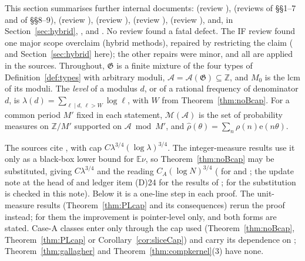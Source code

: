 \documentclass[10pt,reqno]{amsart}
\theoremstyle{definition}
\theoremstyle{remark}
\newcommand{\A}{\mathcal A}
\newcommand{\cG}{\mathfrak G}
\newcommand{\E}{\mathbb E}
\newcommand{\Z}{\mathbb Z}
\newcommand{\e}{\mathrm e}
\begin{document}
This section summarises further internal documents: \cite{LS}
(review \cite{LSrev}), \cite{LS2} (reviews \cite{LS2rev} of \S\S1--7 and
\cite{LS2revb} of \S\S8--9), \cite{LS3} (review \cite{LS3rev}), \cite{LS4} (review \cite{LS4rev}), \cite{PL}
(review \cite{PLrev}), \cite{IF} (review \cite{IFrev}), and, in
Section~\ref{sec:hybrid}, \cite{IF2}, \cite{SPW} and \cite{SPW2}.  No review found a fatal defect.  The IF review found
one major scope overclaim (hybrid methods), repaired by restricting the
claim (\cite[Rem.~2.6]{IF} and Section~\ref{sec:hybrid} here); the other
repairs were minor, and all are applied in the sources.  Throughout, $\cG$ is a finite mixture
of the four types of Definition~\ref{def:types} with arbitrary moduli,
$\A=\A(\cG)\subseteq\Z$, and $M_0$ is the lcm of its moduli.  The \emph{level}
of a modulus $d$, or of a rational frequency of denominator $d$, is
$\lambda(d)=\sum_{\ell\mid d,\,\ell>W}\log\ell$, with $W$ from
Theorem~\ref{thm:noBcap}.  For a common period $M'$ fixed in each statement,
$\mathcal M(\A)$ is the set of probability measures on $\Z/M'$ supported on
$\A\bmod M'$, and $\hat\rho(\theta)=\sum_n\rho(n)\e(n\theta)$.

The sources cite \cite[Thm~5.1]{KA2}, with cap $C\lambda^{3/4}(\log\lambda)^{3/4}$.  The
integer-measure results use it only as a black-box lower bound for $\E\nu$,
so Theorem~\ref{thm:noBcap} may be substituted, giving $C\lambda^{3/4}$ and the
reading $C_A(\log N)^{3/4}$ (\cite[\S4.3]{KA3} for \cite[Thm~3.1]{LS} and
\cite[Cor.~2.3]{IF}; the update note at the head of \cite{LS2} and ledger item
(D)24 for the results of \cite{LS2}; for \cite[Thm~2.5]{IF} the substitution
is checked in this note).  Below it is a one-line step in each proof.  The unit-measure results
(Theorem~\ref{thm:PLcap} and its consequences) rerun the proof instead; for
them the improvement is pointer-level only, and both forms are stated.  Case-A classes enter only through the cap
used (Theorem~\ref{thm:noBcap}, Theorem~\ref{thm:PLcap} or
Corollary~\ref{cor:sliceCap}) and carry its dependence on
\cite{ElsholtzTao}; Theorem~\ref{thm:gallagher} and
Theorem~\ref{thm:compkernel}(3) have none.
\end{document}
